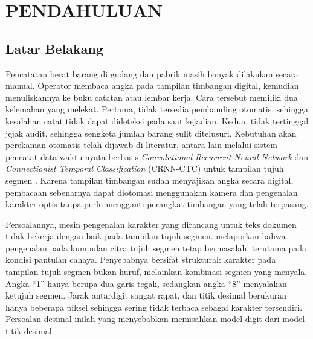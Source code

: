 
\chapter{PENDAHULUAN}

\section{Latar Belakang}

Pencatatan berat barang di gudang dan pabrik masih banyak dilakukan secara
manual. Operator membaca angka pada tampilan timbangan digital, kemudian
menuliskannya ke buku catatan atau lembar kerja. Cara tersebut memiliki dua
kelemahan yang melekat. Pertama, tidak tersedia pembanding otomatis, sehingga
kesalahan catat tidak dapat dideteksi pada saat kejadian. Kedua, tidak
tertinggal jejak audit, sehingga sengketa jumlah barang sulit ditelusuri.
Kebutuhan akan perekaman otomatis telah dijawab di literatur, antara lain
melalui sistem pencatat data waktu nyata berbasis \textit{Convolutional
Recurrent Neural Network} dan \textit{Connectionist Temporal Classification}
(CRNN-CTC) untuk tampilan tujuh segmen \parencite{effendi2025unjuk}. Karena
tampilan timbangan sudah menyajikan angka secara digital, pembacaan sebenarnya
dapat diotomasi menggunakan kamera dan pengenalan karakter optis tanpa perlu
mengganti perangkat timbangan yang telah terpasang.

Persoalannya, mesin pengenalan karakter yang dirancang untuk teks dokumen tidak
bekerja dengan baik pada tampilan tujuh segmen. \textcite{low2024detecting}
melaporkan bahwa pengenalan pada kumpulan citra tujuh segmen tetap bermasalah,
terutama pada kondisi pantulan cahaya. Penyebabnya bersifat struktural:
karakter pada tampilan tujuh segmen bukan huruf, melainkan kombinasi segmen yang
menyala. Angka ``1'' hanya berupa dua garis tegak, sedangkan angka ``8''
menyalakan ketujuh segmen. Jarak antardigit sangat rapat, dan titik desimal
berukuran hanya beberapa piksel sehingga sering tidak terbaca sebagai karakter
tersendiri. Persoalan desimal inilah yang menyebabkan
\textcite{gushima2023automatic} memisahkan model digit dari model titik desimal.

